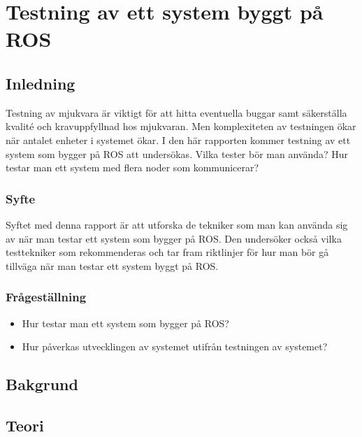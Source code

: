 \chapter{Testning av ett system byggt på ROS}
\label{cha:indiv-report-person}

\section{Inledning}
\label{sec:introduction-person}

Testning av mjukvara är viktigt för att hitta eventuella buggar samt säkerställa kvalité och kravuppfyllnad hos mjukvaran. Men komplexiteten av testningen ökar när antalet enheter i systemet ökar. I den här rapporten kommer testning av ett system som bygger på ROS att undersökas. Vilka tester bör man använda? Hur testar man ett system med flera noder som kommunicerar?

\subsection{Syfte}
\label{sec:purpose-person}

Syftet med denna rapport är att utforska de tekniker som man kan använda sig av när man testar ett system som bygger på ROS. Den undersöker också vilka testtekniker som rekommenderas och tar fram riktlinjer för hur man bör gå tillväga när man testar ett system byggt på ROS.

\subsection{Frågeställning}
\label{sec:issue-person}

\begin{itemize}
	\item Hur testar man ett system som bygger på ROS?
	\item Hur påverkas utvecklingen av systemet utifrån testningen av systemet?
\end{itemize}

\section{Bakgrund}
\label{sec:background-person}


\section{Teori}
\label{sec:theory-person}

